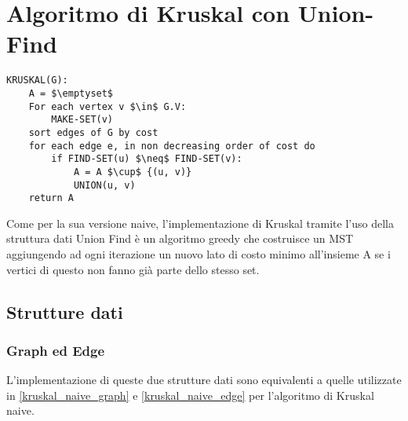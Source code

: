 \section{Algoritmo di Kruskal con Union-Find}

\begin{lstlisting}[mathescape=true]
KRUSKAL(G):
	A = $\emptyset$
	For each vertex v $\in$ G.V:
		MAKE-SET(v)
	sort edges of G by cost
	for each edge e, in non decreasing order of cost do	
		if FIND-SET(u) $\neq$ FIND-SET(v):       
			A = A $\cup$ {(u, v)}
			UNION(u, v)
	return A
\end{lstlisting}

Come per la sua versione naive, l'implementazione di Kruskal tramite l'uso della struttura dati Union Find è un algoritmo greedy che costruisce un MST aggiungendo ad ogni iterazione un nuovo lato di costo minimo all'insieme A se i vertici di questo non fanno già parte dello stesso set.

\subsection{Strutture dati}

	\subsubsection{Graph ed Edge}
		L'implementazione di queste due strutture dati sono equivalenti a quelle utilizzate in \ref{kruskal_naive_graph} e \ref{kruskal_naive_edge} per l'algoritmo di Kruskal naive.
	
